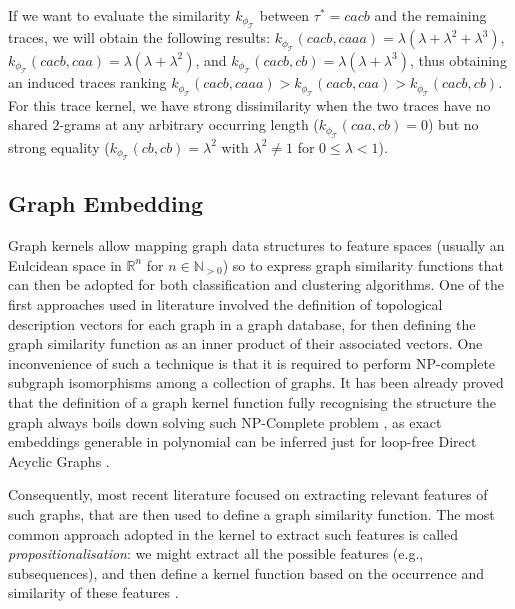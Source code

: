 {\begin{example}
If we want to evaluate the similarity $k_{\phi_{\mathcal{T}}}$ between $\tau^*=cacb$ and the remaining traces, we will obtain the following results: $k_{\phi_{\mathcal{T}}}(cacb,caaa)=\lambda(\lambda+\lambda^2+\lambda^3)$,  $k_{\phi_{\mathcal{T}}}(cacb,caa)=\lambda(\lambda+\lambda^2)$, and $k_{\phi_{\mathcal{T}}}(cacb,cb)=\lambda(\lambda+\lambda^3)$, thus obtaining an induced traces ranking $k_{\phi_{\mathcal{T}}}(cacb,caaa)>k_{\phi_{\mathcal{T}}}(cacb,caa)>k_{\phi_{\mathcal{T}}}(cacb,cb)$. For this trace kernel, we have strong dissimilarity when the two traces have no shared $2$-grams at any arbitrary occurring length ($k_{\phi_{\mathcal{T}}}(caa,cb)=0$) but no strong equality ($k_{\phi_{\mathcal{T}}}(cb,cb)=\lambda^2$ with $\lambda^2\neq 1$ for $0\leq \lambda<1$).
\end{example}

\subsection{Graph Embedding}\label{ssec:ge}
Graph kernels allow mapping graph data structures to feature spaces (usually an Eulcidean space in $\mathbb{R}^n$ for $n\in \mathbb{N}_{>0}$) \cite{Samatova} so to express graph similarity functions that can then be adopted for both classification \cite{TsudaS10} and clustering \cite{Raedt} algorithms. One of the first approaches used in literature involved the definition of topological description vectors \cite{Sidere} for each graph in a graph database, for then defining the graph similarity function as an inner product of their associated vectors. One inconvenience of such a technique is that it is required to perform NP-complete subgraph isomorphisms among a collection of graphs. It has been already proved that the definition of a graph kernel function fully recognising the structure the graph always boils down solving such  NP-Complete problem \cite{GartnerFW03}, as exact embeddings generable in polynomial can be inferred just for loop-free Direct Acyclic Graphs \cite{BergamiBM20}.  


Consequently, most recent literature focused on extracting relevant features of such graphs, that are then used to define a graph similarity function. The most common approach adopted in the kernel to extract such features is called \textit{propositionalisation}: we might extract all the possible features (e.g., subsequences), and then define a kernel function based on the occurrence and similarity of these features \cite{Gartner03}. 

}
